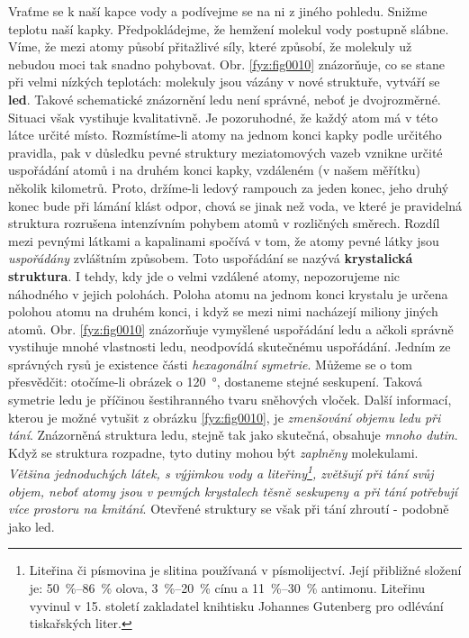     Vraťme se k naší kapce vody a podívejme se na ni z jiného pohledu. Snižme teplotu naší kapky.
    Předpokládejme, že hemžení molekul vody postupně slábne. Víme, že mezi atomy působí přitažlivé
    síly, které způsobí, že molekuly už nebudou moci tak snadno pohybovat. Obr. \ref{fyz:fig0010}
    znázorňuje, co se stane při velmi nízkých teplotách: molekuly jsou vázány v nové struktuře,
    vytváří se \textbf{led}. Takové schematické znázornění ledu není správné, neboť je dvojrozměrné.
    Situaci však vystihuje kvalitativně. Je pozoruhodné, že každý atom má v této látce určité místo.
    Rozmístíme-li atomy na jednom konci kapky podle určitého pravidla, pak v důsledku pevné
    struktury meziatomových vazeb vznikne určité uspořádání atomů i na druhém konci kapky, vzdáleném
    (v našem měřítku) několik kilometrů. Proto, držíme-li ledový rampouch za jeden konec, jeho druhý
    konec bude při lámání klást odpor, chová se jinak než voda, ve které je pravidelná struktura
    rozrušena intenzívním pohybem atomů v rozličných směrech. Rozdíl mezi pevnými látkami a
    kapalinami spočívá v tom, že atomy pevné látky jsou \emph{uspořádány} zvláštním způsobem. Toto
    uspořádání se nazývá \textbf{krystalická struktura}. I tehdy, kdy jde o velmi vzdálené atomy,
    nepozorujeme nic náhodného v jejich polohách. Poloha atomu na jednom konci krystalu je určena
    polohou atomu na druhém konci, i když se mezi nimi nacházejí miliony jiných atomů. Obr.
    \ref{fyz:fig0010} znázorňuje vymyšlené uspořádání ledu a ačkoli správně vystihuje mnohé
    vlastnosti ledu, neodpovídá skutečnému uspořádání. Jedním ze správných rysů je existence části
    \emph{hexagonální symetrie}. Můžeme se o tom přesvědčit: otočíme-li obrázek o \qty{120}{\degree},
    dostaneme stejné seskupení. Taková symetrie ledu je příčinou šestihranného tvaru sněhových
    vloček. Další informací, kterou je možné vytušit z obrázku \ref{fyz:fig0010}, je \emph{zmenšování
    objemu ledu při tání}. Znázorněná struktura ledu, stejně tak jako skutečná, obsahuje \emph{mnoho
    dutin}. Když se struktura rozpadne, tyto dutiny mohou být \emph{zaplněny} molekulami.
    \emph{Většina jednoduchých látek, s výjimkou vody a liteřiny\footnote{Liteřina či písmovina je
    slitina používaná v písmolijectví. Její přibližné složení je: \SIrange{50}{86}{\percent} olova,
    \SIrange{3}{20}{\percent} cínu a \SIrange{11}{30}{\percent} antimonu. Liteřinu vyvinul v 15.
    století zakladatel knihtisku Johannes Gutenberg pro odlévání tiskařských liter.}, zvětšují při
    tání svůj objem, neboť atomy jsou v pevných krystalech těsně seskupeny a při tání potřebují více
    prostoru na kmitání}. Otevřené struktury se však při tání zhroutí - podobně jako led.
    
